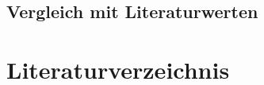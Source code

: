 \documentclass[12pt,a4paper,titlepage,headinclude,bibtotoc]{scrartcl}
\begin{document}
\subsection{Vergleich mit Literaturwerten}

\section{Literaturverzeichnis}






         
         
         
\end{document}
